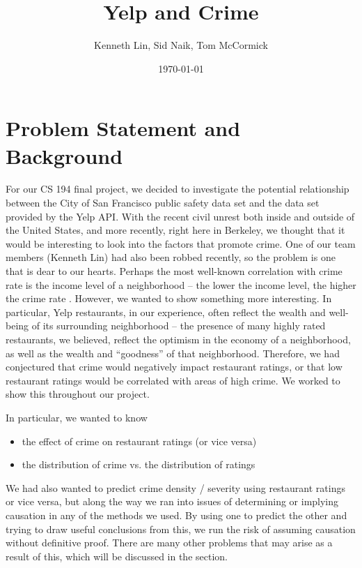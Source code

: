 \documentclass{article}
\title{Yelp and Crime}  %
\author{Kenneth Lin, Sid Naik, Tom McCormick}
\date{\today}
\begin{document}
\maketitle

\section{Problem Statement and Background}

For our CS 194 final project, we decided to investigate the potential
relationship between the City of San Francisco public safety data set and
the data set provided by the Yelp API. With the recent civil unrest both
inside and outside of the United States, and more recently, right here in
Berkeley, we thought that it would be interesting to look into the factors
that promote crime. One of our team members (Kenneth Lin) had also been
robbed recently, so the problem is one that is dear to our hearts. Perhaps
the most well-known correlation with crime rate is the income level of a
neighborhood -- the lower the income level, the higher the crime rate
\cite[p.93-94]{levitt-the-changing-relationship}. However, we wanted to
show something more interesting. In particular, Yelp restaurants, in our
experience, often reflect the wealth and well-being of its surrounding
neighborhood -- the presence of many highly rated restaurants, we believed,
reflect the optimism in the economy of a neighborhood, as well as the
wealth and ``goodness'' of that neighborhood. Therefore, we had conjectured
that crime would negatively impact restaurant ratings, or that low
restaurant ratings would be correlated with areas of high crime. We worked
to show this throughout our project.


In particular, we wanted to know
\begin{itemize}
\item the effect of crime on restaurant ratings (or vice versa)
\item the distribution of crime vs. the distribution of ratings
\end{itemize}

We had also wanted to predict crime density / severity using restaurant
ratings or vice versa, but along the way we ran into issues of determining
or implying causation in any of the methods we used. By using one to
predict the other and trying to draw useful conclusions from this, we run
the risk of assuming causation without definitive proof. There are many
other problems that may arise as a result of this, which will be discussed
in the \textbf{} section.
\end{document}
